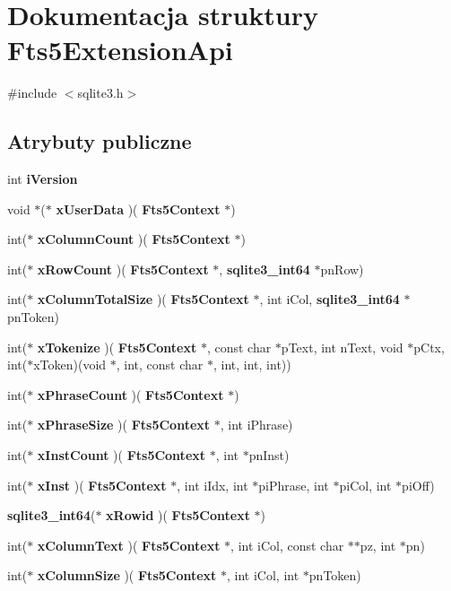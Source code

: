 \section{Dokumentacja struktury Fts5\+Extension\+Api}
\label{struct_fts5_extension_api}


{\ttfamily \#include $<$sqlite3.\+h$>$}

\subsection*{Atrybuty publiczne}
\begin{DoxyCompactItemize}
\item 
int \textbf{ i\+Version}
\item 
void $\ast$($\ast$ \textbf{ x\+User\+Data} )(\textbf{ Fts5\+Context} $\ast$)
\item 
int($\ast$ \textbf{ x\+Column\+Count} )(\textbf{ Fts5\+Context} $\ast$)
\item 
int($\ast$ \textbf{ x\+Row\+Count} )(\textbf{ Fts5\+Context} $\ast$, \textbf{ sqlite3\+\_\+int64} $\ast$pn\+Row)
\item 
int($\ast$ \textbf{ x\+Column\+Total\+Size} )(\textbf{ Fts5\+Context} $\ast$, int i\+Col, \textbf{ sqlite3\+\_\+int64} $\ast$pn\+Token)
\item 
int($\ast$ \textbf{ x\+Tokenize} )(\textbf{ Fts5\+Context} $\ast$, const char $\ast$p\+Text, int n\+Text, void $\ast$p\+Ctx, int($\ast$x\+Token)(void $\ast$, int, const char $\ast$, int, int, int))
\item 
int($\ast$ \textbf{ x\+Phrase\+Count} )(\textbf{ Fts5\+Context} $\ast$)
\item 
int($\ast$ \textbf{ x\+Phrase\+Size} )(\textbf{ Fts5\+Context} $\ast$, int i\+Phrase)
\item 
int($\ast$ \textbf{ x\+Inst\+Count} )(\textbf{ Fts5\+Context} $\ast$, int $\ast$pn\+Inst)
\item 
int($\ast$ \textbf{ x\+Inst} )(\textbf{ Fts5\+Context} $\ast$, int i\+Idx, int $\ast$pi\+Phrase, int $\ast$pi\+Col, int $\ast$pi\+Off)
\item 
\textbf{ sqlite3\+\_\+int64}($\ast$ \textbf{ x\+Rowid} )(\textbf{ Fts5\+Context} $\ast$)
\item 
int($\ast$ \textbf{ x\+Column\+Text} )(\textbf{ Fts5\+Context} $\ast$, int i\+Col, const char $\ast$$\ast$pz, int $\ast$pn)
\item 
int($\ast$ \textbf{ x\+Column\+Size} )(\textbf{ Fts5\+Context} $\ast$, int i\+Col, int $\ast$pn\+Token)
$$
\end{DoxyCompactItemize}
